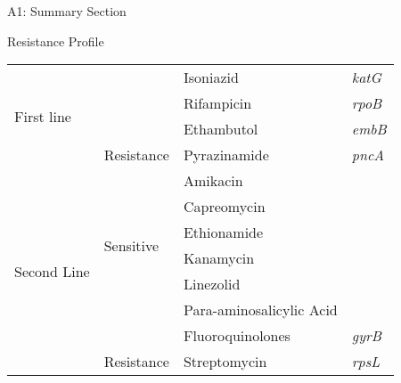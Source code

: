 \documentclass{article}
\begin{document}
\begin{reportSection}{A1: Summary Section}
\begin{reportBox}{Resistance Profile}
\begin{tabular}{|p{}|p{}|p{}|p{}|}
\multirow{4}{*}{First line} & \cellcolor{lightgray} & \cellcolor{lightgray} Isoniazid & \cellcolor{lightgray} \textit{katG} \\
& \cellcolor{lightgray} & \cellcolor{lightgray} Rifampicin & \cellcolor{lightgray} \textit{rpoB} \\
& \cellcolor{lightgray} & \cellcolor{lightgray} Ethambutol & \cellcolor{lightgray} \textit{embB} \\
& \multirow{-4}{*}{\cellcolor{lightgray}Resistance} & \cellcolor{lightgray} Pyrazinamide & \cellcolor{lightgray} \textit{pncA} \\ \cline{1-4}
\hline \multirow{8}{*}{Second Line} & \multirow{6}{*}{Sensitive} & Amikacin & \\
&& Capreomycin & \\
&& Ethionamide & \\
&& Kanamycin & \\
&& Linezolid & \\
&& Para-aminosalicylic Acid & \\ \cline{2-4}
&\cellcolor{lightgray}& \cellcolor{lightgray}Fluoroquinolones & \cellcolor{lightgray}\textit{gyrB} \\
& \multirow{-2}{*}{\cellcolor{lightgray}Resistance} & \cellcolor{lightgray}Streptomycin & \cellcolor{lightgray}\textit{rpsL} \\ \cline{1-4}
\end{tabular}



\end{reportBox}








\end{reportSection}
\end{document}
